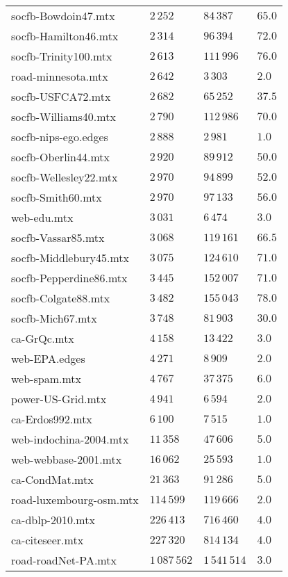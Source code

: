 \begin{tabular}{llll}
    socfb-Bowdoin47.mtx &      $2\,252$ &     $84\,387$ &   $65.0$ \\
   socfb-Hamilton46.mtx &      $2\,314$ &     $96\,394$ &   $72.0$ \\
   socfb-Trinity100.mtx &      $2\,613$ &    $111\,996$ &   $76.0$ \\
     road-minnesota.mtx &      $2\,642$ &      $3\,303$ &    $2.0$ \\
      socfb-USFCA72.mtx &      $2\,682$ &     $65\,252$ &   $37.5$ \\
   socfb-Williams40.mtx &      $2\,790$ &    $112\,986$ &   $70.0$ \\
   socfb-nips-ego.edges &      $2\,888$ &      $2\,981$ &    $1.0$ \\
    socfb-Oberlin44.mtx &      $2\,920$ &     $89\,912$ &   $50.0$ \\
  socfb-Wellesley22.mtx &      $2\,970$ &     $94\,899$ &   $52.0$ \\
      socfb-Smith60.mtx &      $2\,970$ &     $97\,133$ &   $56.0$ \\
            web-edu.mtx &      $3\,031$ &      $6\,474$ &    $3.0$ \\
     socfb-Vassar85.mtx &      $3\,068$ &    $119\,161$ &   $66.5$ \\
 socfb-Middlebury45.mtx &      $3\,075$ &    $124\,610$ &   $71.0$ \\
 socfb-Pepperdine86.mtx &      $3\,445$ &    $152\,007$ &   $71.0$ \\
    socfb-Colgate88.mtx &      $3\,482$ &    $155\,043$ &   $78.0$ \\
       socfb-Mich67.mtx &      $3\,748$ &     $81\,903$ &   $30.0$ \\
            ca-GrQc.mtx &      $4\,158$ &     $13\,422$ &    $3.0$ \\
          web-EPA.edges &      $4\,271$ &      $8\,909$ &    $2.0$ \\
           web-spam.mtx &      $4\,767$ &     $37\,375$ &    $6.0$ \\
      power-US-Grid.mtx &      $4\,941$ &      $6\,594$ &    $2.0$ \\
        ca-Erdos992.mtx &      $6\,100$ &      $7\,515$ &    $1.0$ \\
 web-indochina-2004.mtx &     $11\,358$ &     $47\,606$ &    $5.0$ \\
   web-webbase-2001.mtx &     $16\,062$ &     $25\,593$ &    $1.0$ \\
         ca-CondMat.mtx &     $21\,363$ &     $91\,286$ &    $5.0$ \\
road-luxembourg-osm.mtx &    $114\,599$ &    $119\,666$ &    $2.0$ \\
       ca-dblp-2010.mtx &    $226\,413$ &    $716\,460$ &    $4.0$ \\
        ca-citeseer.mtx &    $227\,320$ &    $814\,134$ &    $4.0$ \\
    road-roadNet-PA.mtx & $1\,087\,562$ & $1\,541\,514$ &    $3.0$ \\
\bottomrule
\end{tabular}
